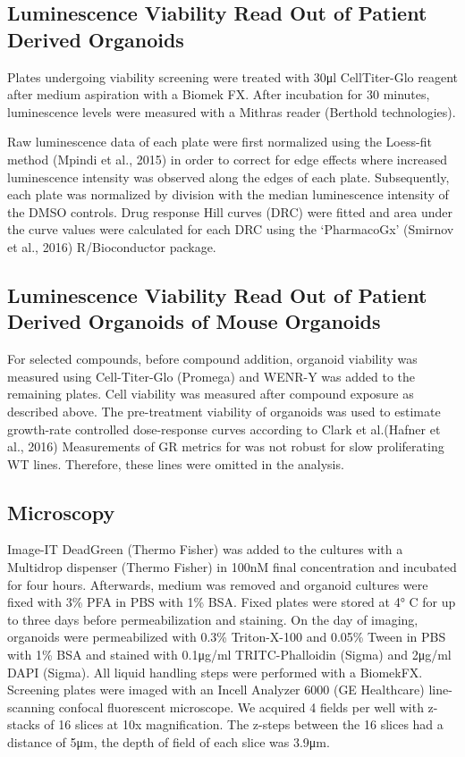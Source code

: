 \begin{flushleft}
\subsection{Luminescence Viability Read Out of Patient Derived Organoids}
Plates undergoing viability screening were treated with 30μl CellTiter-Glo reagent after medium aspiration with a Biomek FX. After incubation for 30 minutes, luminescence levels were measured with a Mithras reader (Berthold technologies).

Raw luminescence data of each plate were first normalized using the Loess-fit method
(Mpindi et al., 2015) in order to correct for edge effects where increased luminescence intensity was observed along the edges of each plate. Subsequently, each plate was normalized by division with the median luminescence intensity of the DMSO controls. Drug response Hill curves (DRC) were fitted and area under the curve values were calculated for each DRC using the ‘PharmacoGx’ (Smirnov et al., 2016) R/Bioconductor package.

\subsection{Luminescence Viability Read Out of Patient Derived Organoids of Mouse Organoids}
For selected compounds, before compound addition, organoid viability was measured using Cell-Titer-Glo (Promega) and WENR-Y was added to the remaining plates. Cell viability was measured after compound exposure as described above. The pre-treatment viability of organoids was used to estimate growth-rate controlled dose-response curves according to Clark et al.(Hafner et al., 2016) Measurements of GR metrics for was not robust for slow proliferating WT lines. Therefore, these lines were omitted in the analysis.

\subsection{Microscopy}
Image-IT DeadGreen (Thermo Fisher) was added to the cultures with a Multidrop dispenser (Thermo Fisher) in 100nM final concentration and incubated for four hours. Afterwards, medium was removed and organoid cultures were fixed with 3\% PFA in PBS with 1\% BSA. Fixed plates were stored at 4° C for up to three days before permeabilization and staining. On the day of imaging, organoids were permeabilized with 0.3\% Triton-X-100 and 0.05\% Tween in PBS with 1\% BSA and stained with 0.1μg/ml TRITC-Phalloidin (Sigma) and 2μg/ml DAPI (Sigma). All liquid handling steps were performed with a BiomekFX. Screening plates were imaged with an Incell Analyzer 6000 (GE Healthcare) line-scanning confocal fluorescent microscope. We acquired 4 fields per well with z-stacks of 16 slices at 10x magnification. The z-steps between the 16 slices had a distance of 5μm, the depth of field of each slice was 3.9μm.


\end{flushleft}
